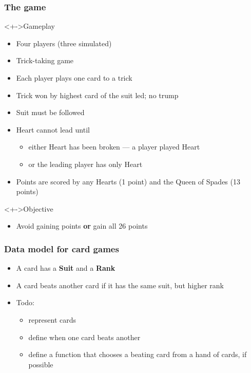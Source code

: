 \documentclass{beamer}
\begin{document}
\begin{frame}
  \frametitle{The game}
  \begin{block}<+->{Gameplay}
    \begin{itemize}
    \item Four players (three simulated)
    \item Trick-taking game
    \item Each player plays one card to a trick
    \item Trick won by highest card of the suit led; no trump
    \item Suit must be followed
    \item Heart cannot lead until
      \begin{itemize}
      \item either Heart has been broken --- a player played Heart
      \item or the leading player has only Heart
      \end{itemize}
    \item Points are scored by any Hearts (1 point) and the Queen of Spades (13 points) 
    \end{itemize}
  \end{block}
  \begin{block}<+->{Objective}
    \begin{itemize}
    \item Avoid gaining points \textbf{or} gain all 26 points
    \end{itemize}
  \end{block}
  
\end{frame}
\begin{frame}
  \frametitle{Data model for card games}
  \begin{itemize}
  \item A card has a \textbf{Suit} and a \textbf{Rank}
  \item A card beats another card if it has the same suit, but higher rank
  \item Todo:
    \begin{itemize}
    \item represent cards
    \item define when one card beats another
    \item define a function that chooses a beating card from a hand of
      cards, if possible
    \end{itemize}
  \end{itemize}
\end{frame}
\end{document}
